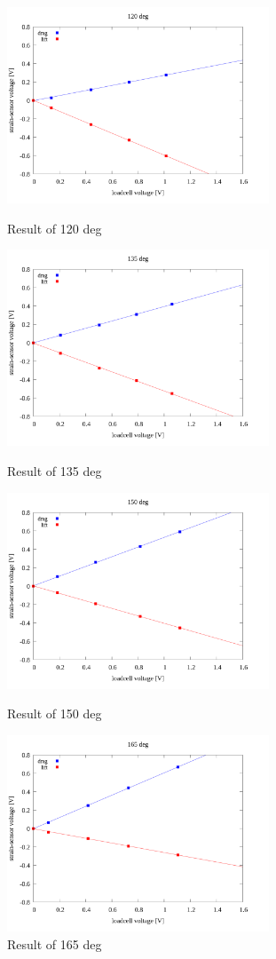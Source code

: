 \documentclass[twocolumn,a4j]{jsarticle}
\begin{document}
\par
\newpage

\begin{figure}[htbp]
    \footnotesize
    \begin{center}
        \includegraphics[width=78mm]{../images/linear/120_linear.png}
        \caption{Result of 120 deg}
        \includegraphics[width=78mm]{../images/linear/135_linear.png}
        \caption{Result of 135 deg}
        \includegraphics[width=78mm]{../images/linear/150_linear.png}
        \caption{Result of 150 deg}
        \includegraphics[width=78mm]{../images/linear/165_linear.png}
        \caption{Result of 165 deg}
    \end{center}
\end{figure}
\end{document}
